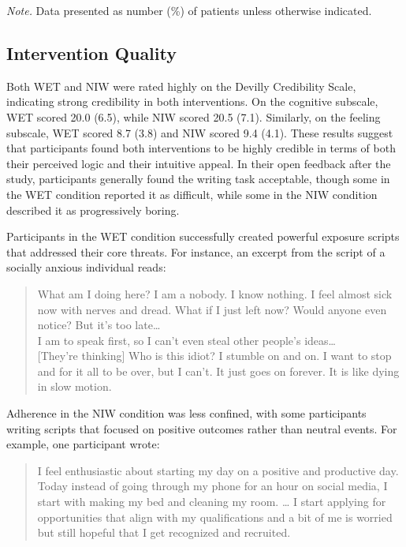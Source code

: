 \documentclass[
  man,floatsintext]{apa7}
\begin{document}
\begin{table}[tbp]
\begin{center}
\begin{threeparttable}
\begin{tablenotes}[para]
\normalsize{\textit{Note.} Data presented as number (\%) of patients unless otherwise indicated.}
\end{tablenotes}

\end{threeparttable}
\end{center}

\end{table}

\subsection{Intervention Quality}\label{intervention-quality}

Both WET and NIW were rated highly on the Devilly Credibility Scale, indicating strong credibility in both interventions.
On the cognitive subscale, WET scored 20.0 (6.5), while NIW scored 20.5 (7.1).
Similarly, on the feeling subscale, WET scored 8.7 (3.8) and NIW scored 9.4 (4.1).
These results suggest that participants found both interventions to be highly credible in terms of both their perceived logic and their intuitive appeal.
In their open feedback after the study, participants generally found the writing task acceptable, though some in the WET condition reported it as difficult, while some in the NIW condition described it as progressively boring.

Participants in the WET condition successfully created powerful exposure scripts that addressed their core threats.
For instance, an excerpt from the script of a socially anxious individual reads:

\begin{quote}
What am I doing here? I am a nobody. I know nothing. I feel almost sick now with nerves and dread. What if I just left now? Would anyone even notice? But it's too late\ldots{}\\
I am to speak first, so I can't even steal other people's ideas\ldots{}\\
{[}They're thinking{]} Who is this idiot? I stumble on and on. I want to stop and for it all to be over, but I can't. It just goes on forever. It is like dying in slow motion.
\end{quote}

Adherence in the NIW condition was less confined, with some participants writing scripts that focused on positive outcomes rather than neutral events.
For example, one participant wrote:

\begin{quote}
I feel enthusiastic about starting my day on a positive and productive day.
Today instead of going through my phone for an hour on social media, I start with making my bed and cleaning my room.
\ldots{} I start applying for opportunities that align with my qualifications and a bit of me is worried but still hopeful that I get recognized and recruited.
\end{quote}
\end{document}
